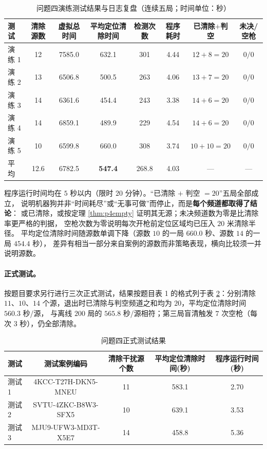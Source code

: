 \documentclass[withoutpreface, bwprint]{cumcmthesis}
\begin{document}
\begin{table}[H]
  \centering
  \caption{问题四演练测试结果与日志复盘（连续五局；时间单位：秒）}
  \label{tab:p4official}
  \footnotesize
  \begin{tabularx}{\textwidth}{Xccccccc}
    \toprule
    测试 & 清除源数 & 虚拟总时间 & 平均定位清除时间 & 检测次数 & 程序耗时
      & 已清除$+$判空 & 未决/空枪 \\
    \midrule
    演练 1 & 12 & 7585.0 & 632.1 & 301 & 4.44 & $12{+}8=20$ & $0/0$ \\
    演练 2 & 13 & 6506.8 & 500.5 & 263 & 4.06 & $13{+}7=20$ & $0/0$ \\
    演练 3 & 14 & 6361.6 & 454.4 & 243 & 3.38 & $14{+}6=20$ & $0/0$ \\
    演练 4 & 14 & 6859.1 & 489.9 & 229 & 4.54 & $14{+}6=20$ & $0/0$ \\
    演练 5 & 10 & 6599.8 & 660.0 & 308 & 3.74 & $10{+}10=20$ & $0/0$ \\
    \midrule
    平均 & 12.6 & 6782.5 & \textbf{547.4} & 268.8 & 4.03 & --- & --- \\
    \bottomrule
  \end{tabularx}
\end{table}

程序运行时间均在 $5$ 秒以内（限时 $20$ 分钟）。“已清除 $+$ 判空 $=20$”五局全部成立，
说明机器狗并非“时间耗尽”或“无事可做”而停止，而是\textbf{每个频道都取得了结论}：
或已清除，或按定理 \ref{thm:p4empty} 证明其无源；未决频道数为零是比清除率更严格的判据，
空枪次数为零说明每次开枪前定位区域均已压入 $20$ 米清除半径。
平均定位清除时间随源数单调下降（源数 $10$ 的一局 $660.0$ 秒、源数 $14$ 的一局 $454.4$ 秒），
差异有相当一部分来自案例的源数而非策略表现，横向比较须一并说明源数。

\paragraph{正式测试。}
按题目要求另行进行三次正式测试，结果按题目表 1 的格式列于表 \ref{tab:p4formal}：分别清除
$11$、$10$、$14$ 个源，退出时已清除与判空频道之和均为 $20$，平均定位清除时间 $560.3$ 秒/源，
与离线 $200$ 局的 $565.8$ 秒/源相符；第三局盲清触发 $7$ 次空枪（每次 $3$ 秒），仍全部清除。

\begin{table}[H]
  \centering
  \caption{问题四正式测试结果}
  \label{tab:p4formal}
  \footnotesize
  \begin{tabular}{lcccc}
    \toprule
    测试 & 测试案例编码 & 清除干扰源个数 & 平均定位清除时间(秒) & 程序运行时间(秒) \\
    \midrule
    测试 1 & 4KCC-T27H-DKN5-MNEU & 11 & 583.1 & 2.70 \\
    测试 2 & SVTU-4ZKC-B8W3-SFX5 & 10 & 639.1 & 3.53 \\
    测试 3 & MJU9-UFW3-MD3T-X5E7 & 14 & 458.8 & 5.36 \\
    \bottomrule
  \end{tabular}
\end{table}
\end{document}
